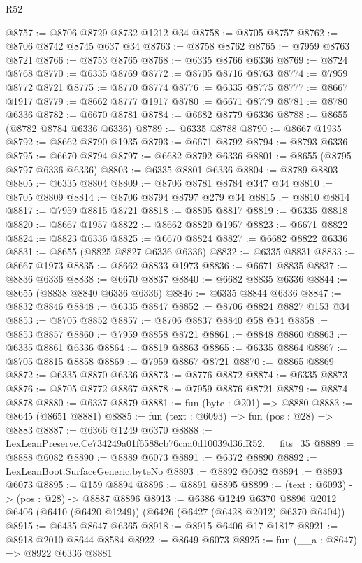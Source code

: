\begin{lexlean}{R52}
\begin{coremodule}
@8757 := @8706 @8729 @8732 @1212 @34
@8758 := @8705 @8757
@8762 := @8706 @8742 @8745 @637 @34
@8763 := @8758 @8762
@8765 := @7959 @8763 @8721
@8766 := @8753 @8765
@8768 := @6335 @8766 @6336
@8769 := @8724 @8768
@8770 := @6335 @8769
@8772 := @8705 @8716 @8763
@8774 := @7959 @8772 @8721
@8775 := @8770 @8774
@8776 := @6335 @8775
@8777 := @8667 @1917
@8779 := @8662 @8777 @1917
@8780 := @6671 @8779
@8781 := @8780 @6336
@8782 := @6670 @8781
@8784 := @6682 @8779 @6336
@8788 := @8655 (@8782 @8784 @6336 @6336)
@8789 := @6335 @8788
@8790 := @8667 @1935
@8792 := @8662 @8790 @1935
@8793 := @6671 @8792
@8794 := @8793 @6336
@8795 := @6670 @8794
@8797 := @6682 @8792 @6336
@8801 := @8655 (@8795 @8797 @6336 @6336)
@8803 := @6335 @8801 @6336
@8804 := @8789 @8803
@8805 := @6335 @8804
@8809 := @8706 @8781 @8784 @347 @34
@8810 := @8705 @8809
@8814 := @8706 @8794 @8797 @279 @34
@8815 := @8810 @8814
@8817 := @7959 @8815 @8721
@8818 := @8805 @8817
@8819 := @6335 @8818
@8820 := @8667 @1957
@8822 := @8662 @8820 @1957
@8823 := @6671 @8822
@8824 := @8823 @6336
@8825 := @6670 @8824
@8827 := @6682 @8822 @6336
@8831 := @8655 (@8825 @8827 @6336 @6336)
@8832 := @6335 @8831
@8833 := @8667 @1973
@8835 := @8662 @8833 @1973
@8836 := @6671 @8835
@8837 := @8836 @6336
@8838 := @6670 @8837
@8840 := @6682 @8835 @6336
@8844 := @8655 (@8838 @8840 @6336 @6336)
@8846 := @6335 @8844 @6336
@8847 := @8832 @8846
@8848 := @6335 @8847
@8852 := @8706 @8824 @8827 @153 @34
@8853 := @8705 @8852
@8857 := @8706 @8837 @8840 @58 @34
@8858 := @8853 @8857
@8860 := @7959 @8858 @8721
@8861 := @8848 @8860
@8863 := @6335 @8861 @6336
@8864 := @8819 @8863
@8865 := @6335 @8864
@8867 := @8705 @8815 @8858
@8869 := @7959 @8867 @8721
@8870 := @8865 @8869
@8872 := @6335 @8870 @6336
@8873 := @8776 @8872
@8874 := @6335 @8873
@8876 := @8705 @8772 @8867
@8878 := @7959 @8876 @8721
@8879 := @8874 @8878
@8880 := @6337 @8879
@8881 := fun (byte : @201) => @8880
@8883 := @8645 (@8651 @8881)
@8885 := fun (text : @6093) => fun (pos : @28) => @8883
@8887 := @6366 @1249 @6370
@8888 := LexLeanPreserve.Ce734249a01f6588cb76caa0d10039d36.R52.__fits_35
@8889 := @8888 @6082
@8890 := @8889 @6073
@8891 := @6372 @8890
@8892 := LexLeanBoot.SurfaceGeneric.byteNo
@8893 := @8892 @6082
@8894 := @8893 @6073
@8895 := @159 @8894
@8896 := @8891 @8895
@8899 := (text : @6093) -> (pos : @28) -> @8887 @8896
@8913 := @6386
    @1249
    @6370
    @8896
    @2012
    @6406
    (@6410 (@6420 @1249))
    (@6426 (@6427 (@6428 @2012) @6370 @6404))
@8915 := @6435 @8647 @6365
@8918 := @8915 @6406 @17 @1817
@8921 := @8918 @2010 @8644 @8584
@8922 := @8649 @6073
@8925 := fun (__a : @8647) => @8922 @6336 @8881

\end{coremodule}
\end{lexlean}
